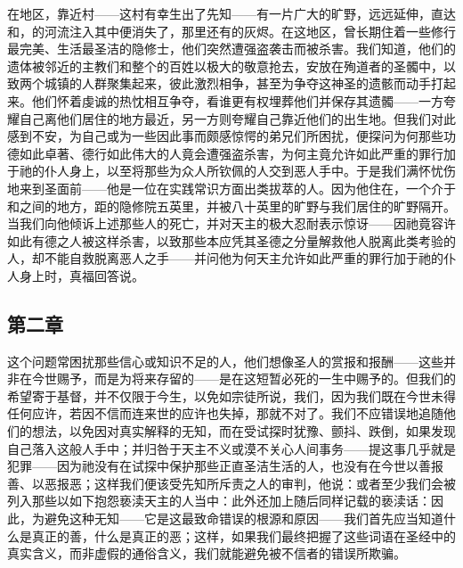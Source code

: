 在地区，靠近村——这村有幸生出了先知——有一片广大的旷野，远远延伸，直达和，的河流注入其中便消失了，那里还有的灰烬。在这地区，曾长期住着一些修行最完美、生活最圣洁的隐修士，他们突然遭强盗袭击而被杀害。我们知道，他们的遗体被邻近的主教们和整个的百姓以极大的敬意抢去，安放在殉道者的圣髑中，以致两个城镇的人群聚集起来，彼此激烈相争，甚至为争夺这神圣的遗骸而动手打起来。他们怀着虔诚的热忱相互争夺，看谁更有权埋葬他们并保存其遗髑——一方夸耀自己离他们居住的地方最近，另一方则夸耀自己靠近他们的出生地。但我们对此感到不安，为自己或为一些因此事而颇感惊愕的弟兄们所困扰，便探问为何那些功德如此卓著、德行如此伟大的人竟会遭强盗杀害，为何主竟允许如此严重的罪行加于祂的仆人身上，以至将那些为众人所钦佩的人交到恶人手中。于是我们满怀忧伤地来到圣面前——他是一位在实践常识方面出类拔萃的人。因为他住在，一个介于和之间的地方，距的隐修院五英里，并被八十英里的旷野与我们居住的旷野隔开。当我们向他倾诉上述那些人的死亡，并对天主的极大忍耐表示惊讶——因祂竟容许如此有德之人被这样杀害，以致那些本应凭其圣德之分量解救他人脱离此类考验的人，却不能自救脱离恶人之手——并问他为何天主允许如此严重的罪行加于祂的仆人身上时，真福回答说。\par


\subsection{第二章}

\par

这个问题常困扰那些信心或知识不足的人，他们想像圣人的赏报和报酬——这些并非在今世赐予，而是为将来存留的——是在这短暂必死的一生中赐予的。但我们的希望寄于基督，并不仅限于今生，以免如宗徒所说，我们，因为我们既在今世未得任何应许，若因不信而连来世的应许也失掉，那就不对了。我们不应错误地追随他们的想法，以免因对真实解释的无知，而在受试探时犹豫、颤抖、跌倒，如果发现自己落入这般人手中；并归咎于天主不义或漠不关心人间事务——提这事几乎就是犯罪——因为祂没有在试探中保护那些正直圣洁生活的人，也没有在今世以善报善、以恶报恶；这样我们便该受先知所斥责之人的审判，他说：或者至少我们会被列入那些以如下抱怨亵渎天主的人当中：此外还加上随后同样记载的亵渎话：因此，为避免这种无知——它是这最致命错误的根源和原因——我们首先应当知道什么是真正的善，什么是真正的恶；这样，如果我们最终把握了这些词语在圣经中的真实含义，而非虚假的通俗含义，我们就能避免被不信者的错误所欺骗。\par


